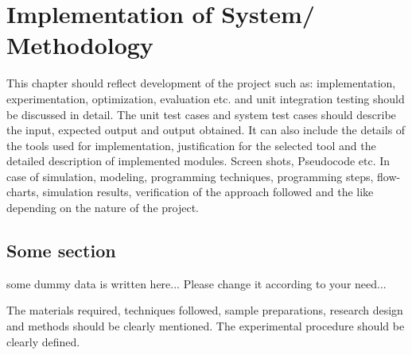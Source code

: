 \chapter{Implementation of System/ Methodology}
This chapter should reflect development of the project such as: implementation, experimentation, optimization, evaluation etc. and unit integration testing should be discussed in detail.  The unit test cases and system test cases should describe the input, expected output and output obtained. It can also include the details of the tools used for implementation, justification for the selected tool and the detailed description of implemented modules.  Screen shots, Pseudocode etc. 
In case of simulation, modeling, programming techniques, programming steps, flow-charts, simulation results, verification of the approach followed and the like depending on the nature of the project. 
\section{Some section}
some dummy data is written here... Please change it according to your need...

The materials required, techniques followed, sample preparations, research design and methods should be clearly mentioned. The experimental procedure should be clearly defined.
